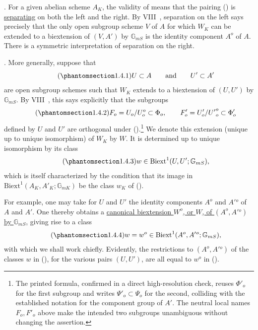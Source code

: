 \medskip
\noindent
{}. For a given abelian scheme $A_K$, the validity of  means that
the pairing () is \underline{separating} on both the left and the
right.  By VIII~, separation on the left says precisely that the
only open subgroup scheme $V$ of $A$ for which $W_K$ can be extended to
a biextension of $(V,A')$ by $\mathbb G_{mS}$ is the identity component
$A^o$ of $A$.  There is a symmetric interpretation of separation on
the right.

\medskip
\noindent
{}. More generally, suppose that
\begin{equation}\tag{\SGARefTarget{sga7.sga7i.eix.n1-4-1}{1.4.1}}
 U\subset A\qquad\text{and}\qquad U'\subset A'
\end{equation}
are open subgroup schemes such that $W_K$ extends to a biextension of
$(U,U')$ by $\mathbb G_{mS}$.  By VIII~, this says explicitly that
the subgroups
\begin{equation}\tag{\SGARefTarget{sga7.sga7i.eix.n1-4-2}{1.4.2}}
 F_o=U_o/U_o^o\subset\Phi_o,
 \qquad
 F'_o=U'_o/{U'}_o^o\subset\Phi'_o
\end{equation}
defined by $U$ and $U'$ are orthogonal under ().\footnote{The
printed formula, confirmed in a direct high-resolution check, reuses
$\Phi'_o$ for the first subgroup and writes $\Psi'_o\subset\Psi_o$ for
the second, colliding with the established notation for the component
group of $A'$.  The neutral local names $F_o,F'_o$ above make the
intended two subgroups unambiguous without changing the assertion.}
We denote this extension (unique up to unique isomorphism) of $W_K$ by
$W$.  It is determined up to unique isomorphism by its class
\begin{equation}\tag{\SGARefTarget{sga7.sga7i.eix.n1-4-3}{1.4.3}}
 w\in\mathrm{Biext}^1(U,U';\mathbb G_{mS}),
\end{equation}
which is itself characterized by the condition that its image in
$\mathrm{Biext}^1(A_K,A'_K;\mathbb G_{mK})$ be the class $w_K$ of
().

For example, one may take for $U$ and $U'$ the identity components
$A^o$ and $A'{}^o$ of $A$ and $A'$.  One thereby obtains a
\underline{canonical biextension $W^o$, or $W$, of $(A^o,A'{}^o)$ by
$\mathbb G_{mS}$}, giving rise to a class
\begin{equation}\tag{\SGARefTarget{sga7.sga7i.eix.n1-4-4}{1.4.4}}
 w=w^o\in\mathrm{Biext}^1(A^o,A'{}^o;\mathbb G_{mS}),
\end{equation}
with which we shall work chiefly.  Evidently, the restrictions to
$(A^o,A'{}^o)$ of the classes $w$ in (), for the various pairs
$(U,U')$, are all equal to $w^o$ in ().

